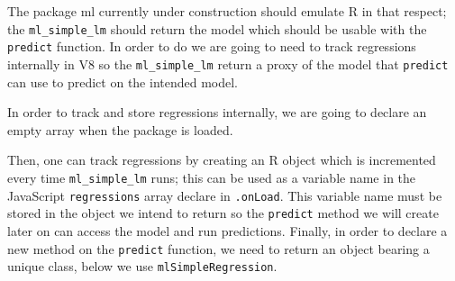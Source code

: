\documentclass[10pt,]{krantz}
\makeatletter
\newenvironment{Shaded}{\begin{snugshade}}{\end{snugshade}}
\newcommand{\CommentTok}[1]{\textcolor[rgb]{0.37,0.37,0.37}{\textit{#1}}}
\newcommand{\ControlFlowTok}[1]{\textcolor[rgb]{0.27,0.27,0.27}{\textbf{#1}}}
\newcommand{\DataTypeTok}[1]{\textcolor[rgb]{0.27,0.27,0.27}{#1}}
\newcommand{\KeywordTok}[1]{\textcolor[rgb]{0.27,0.27,0.27}{\textbf{#1}}}
\newcommand{\NormalTok}[1]{#1}
\newcommand{\OperatorTok}[1]{\textcolor[rgb]{0.43,0.43,0.43}{\textbf{#1}}}
\newcommand{\OtherTok}[1]{\textcolor[rgb]{0.37,0.37,0.37}{#1}}
\newcommand{\StringTok}[1]{\textcolor[rgb]{0.5,0.5,0.5}{#1}}
\newenvironment{kframe}{%
\medskip{}
\setlength{\fboxsep}{.8em}
 \def\at@end@of@kframe{}%
 \ifinner\ifhmode%
  \def\at@end@of@kframe{\end{minipage}}%
  \begin{minipage}{\columnwidth}%
 \fi\fi%
 \def\FrameCommand##1{\hskip\@totalleftmargin \hskip-\fboxsep
 \colorbox{shadecolor}{##1}\hskip-\fboxsep
     \hskip-\linewidth \hskip-\@totalleftmargin \hskip\columnwidth}%
 \MakeFramed {\advance\hsize-\width
   \@totalleftmargin\z@ \linewidth\hsize
   \@setminipage}}%
 {\par\unskip\endMakeFramed%
 \at@end@of@kframe}
\renewenvironment{Shaded}{\begin{kframe}}{\end{kframe}}
\makeatother
\begin{document}
The package ml currently under construction should emulate R in that respect; the \texttt{ml\_simple\_lm} should return the model which should be usable with the \texttt{predict} function. In order to do we are going to need to track regressions internally in V8 so the \texttt{ml\_simple\_lm} return a proxy of the model that \texttt{predict} can use to predict on the intended model.

In order to track and store regressions internally, we are going to declare an empty array when the package is loaded.

\begin{Shaded}
\end{Shaded}

Then, one can track regressions by creating an R object which is incremented every time \texttt{ml\_simple\_lm} runs; this can be used as a variable name in the JavaScript \texttt{regressions} array declare in \texttt{.onLoad}. This variable name must be stored in the object we intend to return so the \texttt{predict} method we will create later on can access the model and run predictions. Finally, in order to declare a new method on the \texttt{predict} function, we need to return an object bearing a unique class, below we use \texttt{mlSimpleRegression}.
\end{document}
